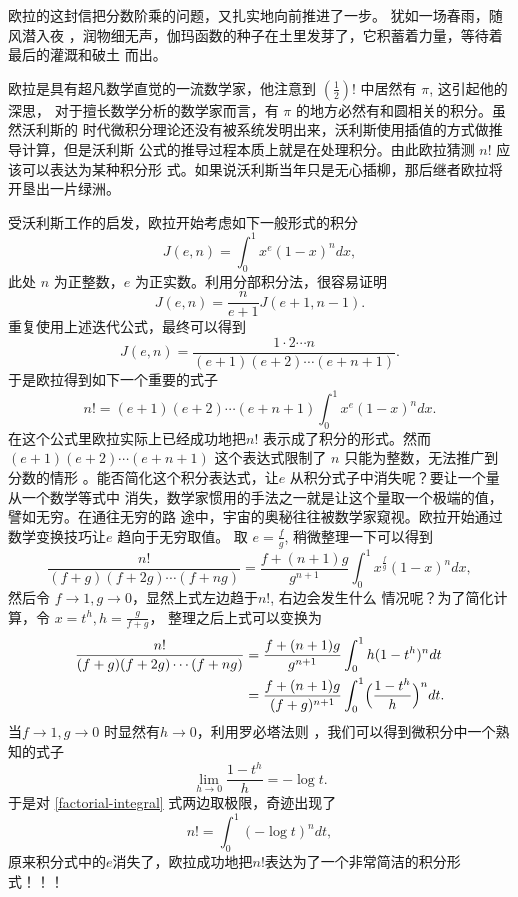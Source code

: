 {欧拉的这封信把分数阶乘的问题，又扎实地向前推进了一步。 犹如一场春雨，随风潜入夜
，润物细无声，伽玛函数的种子在土里发芽了，它积蓄着力量，等待着最后的灌溉和破土
而出。

欧拉是具有超凡数学直觉的一流数学家，他注意到 $ (\frac{1}{2})!$ 中居然有 $\pi$,
这引起他的深思，
对于擅长数学分析的数学家而言，有 $\pi$ 的地方必然有和圆相关的积分。虽然沃利斯的
时代微积分理论还没有被系统发明出来，沃利斯使用插值的方式做推导计算，但是沃利斯
公式的推导过程本质上就是在处理积分。由此欧拉猜测 $n!$ 应该可以表达为某种积分形
式。如果说沃利斯当年只是无心插柳，那后继者欧拉将开垦出一片绿洲。 

受沃利斯工作的启发，欧拉开始考虑如下一般形式的积分
$$ J(e,n) = \int_0^1 x^e(1-x)^ndx ,$$
此处 $n$ 为正整数，$e$ 为正实数。利用分部积分法，很容易证明
$$ J(e,n) = \frac{n}{e+1}J(e+1,n-1) .$$
重复使用上述迭代公式，最终可以得到
$$ J(e,n) = \frac{1\cdot2\cdots n}{(e+1)(e+2)\cdots(e+n+1)} .$$
于是欧拉得到如下一个重要的式子
\begin{equation}
n! = (e+1)(e+2)\cdots(e+n+1)\int_0^1 x^e(1-x)^ndx .
\end{equation}
在这个公式里欧拉实际上已经成功地把$n!$ 表示成了积分的形式。然而
$(e+1)(e+2)\cdots(e+n+1)$ 这个表达式限制了 $n$ 只能为整数，无法推广到分数的情形
。能否简化这个积分表达式，让$e$ 从积分式子中消失呢？要让一个量从一个数学等式中
消失，数学家惯用的手法之一就是让这个量取一个极端的值，譬如无穷。在通往无穷的路
途中，宇宙的奥秘往往被数学家窥视。欧拉开始通过数学变换技巧让$e$ 趋向于无穷取值。
取
$e=\frac{f}{g}$, 稍微整理一下可以得到
$$ \frac{n!}{(f+g)(f+2g)\cdots(f+ng)} = \frac{f+(n+1)g}{g^{n+1}} \int_0^1 x^\frac{f}{g}(1-x)^n dx , $$
然后令 $f \rightarrow 1, g \rightarrow 0$，显然上式左边趋于$n!$, 右边会发生什么
情况呢？为了简化计算，令 $x=t^h, h=\frac{g}{f+g}$， 整理之后上式可以变换为
\begin{align}
\frac{n!}{(f+g)(f+2g)\cdots(f+ng)}
& = \frac{f+(n+1)g}{g^{n+1}} \int_0^1 h(1-t^h)^n dt  \notag \\
& = \frac{f+(n+1)g}{(f+g)^{n+1}} \int_0^1 \Bigl(\frac{1-t^h}{h}\Bigr)^n dt .
\label{factorial-integral}
\end{align}
当$f \rightarrow 1, g \rightarrow 0$ 时显然有$h \rightarrow 0$，利用罗必塔法则
，我们可以得到微积分中一个熟知的式子
$$ \lim_{h \rightarrow 0} \frac{1-t^h}{h} = -\log t .$$
于是对 \eqref{factorial-integral} 式两边取极限，奇迹出现了
\begin{equation}
\label{factorial-gamma-1}
n! = \int_0^1 (-\log t)^ndt, 
\end{equation}
原来积分式中的$e$消失了，欧拉成功地把$n!$表达为了一个非常简洁的积分形式！！！
}
